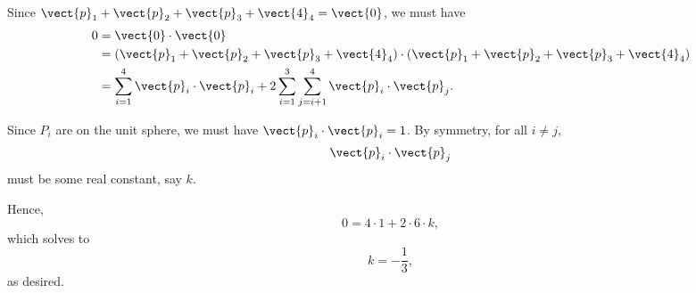 \Question{\currfilebase}

Since \(\vect{p}_1 + \vect{p}_2 + \vect{p}_3 + \vect{4}_4 = \vect{0}\), we must have
\begin{align*}
    0 & = \vect{0} \cdot \vect{0}                                                                                                             \\
      & = \left(\vect{p}_1 + \vect{p}_2 + \vect{p}_3 + \vect{4}_4\right) \cdot \left(\vect{p}_1 + \vect{p}_2 + \vect{p}_3 + \vect{4}_4\right) \\
      & = \sum_{i = 1}^{4} \vect{p}_i \cdot \vect{p}_i + 2 \sum_{i = 1}^{3} \sum_{j = i + 1}^{4} \vect{p}_i \cdot \vect{p}_j.
\end{align*}

Since \(P_i\) are on the unit sphere, we must have \(\vect{p}_i \cdot \vect{p}_i = 1\). By symmetry, for all \(i \neq j\), \[
    \vect{p}_i \cdot \vect{p}_j
\]
must be some real constant, say \(k\).

Hence,
\[
    0 = 4 \cdot 1 + 2 \cdot 6 \cdot k,
\]
which solves to
\[
    k = -\frac{1}{3},
\]
as desired.

